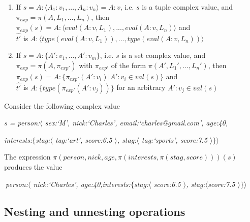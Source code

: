 \begin{itemize}
	\begin{enumerate}
		\item If $s = A:\langle A_1:v_1,...,A_n:v_n \rangle = A:v$, i.e. $s$ is a tuple complex value, and $\pi_{exp} = \pi(A, L_1,...,L_n)$, then \\
					\hspace{1.5cm}$\pi_{exp}(s) = A:\langle eval(A:v, L_1),...,eval(A:v, L_n) \rangle$ and \\
					\hspace{1.5cm}$\hat{t'}$ is $A:\langle type(eval(A:v, L_1)),...,type(eval(A:v, L_n)) \rangle$
		\item If $s = A:\{ A':v_1,...,A':v_m \}$, i.e. $s$ is a set complex value, and $\pi_{exp} = \pi(A, \pi_{exp'})$ with $\pi_{exp'}$ of the form $\pi(A', L_1',...,L_n')$, then \\
     			\hspace{1.5cm}$\pi_{exp}(s) = A:\{ \pi_{exp'}(A':v_i) | A':v_i \in val(s) \} $ and \\
					\hspace{1.5cm}$\hat{t'}$ is $A:\{type(\pi_{exp'}(A':v_j))\}$ for an arbitrary $A':v_j \in val(s)$
	\end{enumerate}

\end{itemize}

\noindent Consider the following complex value

\vspace*{0.25cm}
\noindent \textit{s = person:$\langle$ sex:`M', nick:`Charles', email:`charles@gmail.com', age:40,}

\hspace*{1.0cm} \textit{interests:$\{$stag:$\langle$ tag:`art', score:6.5 $\rangle$, stag:$\langle$ tag:`sports', score:7.5 $\rangle \} \rangle$}

\vspace*{0.25cm}
\noindent The expression $\pi(person, nick, age, \pi(interests, \pi(stag, score)))(s)$ produces the value

\vspace*{0.25cm}
\noindent \textit{$ \ $person:$\langle$ nick:`Charles', age:40,}\hspace*{0.0cm}\textit{interests:$\{$stag:$\langle$ score:6.5 $\rangle$, stag:$\langle$score:7.5 $\rangle \} \rangle \ $}

\subsection{Nesting and unnesting operations}

